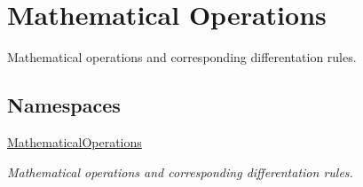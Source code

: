\hypertarget{group__MathematicalOperationsGroup}{\section{Mathematical Operations}
\label{group__MathematicalOperationsGroup}
}


Mathematical operations and corresponding differentation rules.  


\subsection*{Namespaces}
\begin{DoxyCompactItemize}
\item 
\hyperlink{namespaceMathematicalOperations}{Mathematical\-Operations}
\begin{DoxyCompactList}\small\item\em Mathematical operations and corresponding differentation rules. \end{DoxyCompactList}\end{DoxyCompactItemize}
